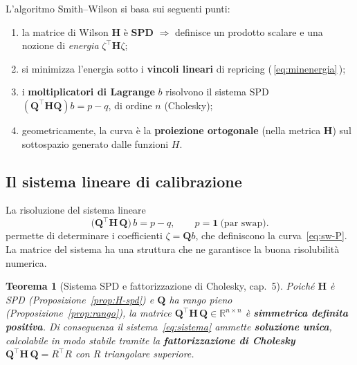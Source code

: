 \documentclass[11pt,a4paper]{article}
\theoremstyle{plain}
\newtheorem{teorema}{Teorema}[section]
\theoremstyle{definition}
\theoremstyle{remark}
\newcommand{\Qmat}{\mathbf{Q}}
\newcommand{\Hmat}{\mathbf{H}}
\newcommand{\transp}{^{\!\top}}
\begin{document}
\begin{keybox}
L'algoritmo Smith--Wilson si basa sui seguenti punti:
\begin{enumerate}
  \item la matrice di Wilson $\Hmat$ \`e \textbf{SPD} $\Rightarrow$ definisce un prodotto
        scalare e una nozione di \emph{energia} $\zeta\transp\Hmat\zeta$;
  \item si minimizza l'energia sotto i \textbf{vincoli lineari} di repricing
        (\,\eqref{eq:minenergia}\,);
  \item i \textbf{moltiplicatori di Lagrange} $b$ risolvono il sistema SPD
        $(\Qmat\transp\Hmat\Qmat)b = p-q$, di ordine $n$ (Cholesky);
  \item geometricamente, la curva \`e la \textbf{proiezione ortogonale} (nella metrica
        $\Hmat$) sul sottospazio generato dalle funzioni $H$.
\end{enumerate}
\end{keybox}

\subsection{Il sistema lineare di calibrazione}

La risoluzione del sistema lineare
\begin{equation}
  \bigl(\Qmat\transp \Hmat\, \Qmat\bigr)\, b = p - q,
  \qquad p = \mathbf{1}\ \text{(par swap)} .
  \label{eq:sistema}
\end{equation}
permette di determinare i coefficienti $\zeta = \Qmat b$, che definiscono la curva~\eqref{eq:sw-P}.
La matrice del sistema ha una struttura che ne garantisce la buona risolubilit\`a numerica.

\begin{teorema}[Sistema SPD e fattorizzazione di Cholesky, \cite{quarteroni2017} cap.~5]
\label{thm:spd}
Poich\'e $\Hmat$ \`e SPD (Proposizione~\ref{prop:H-spd}) e $\Qmat$ ha rango pieno
(Proposizione~\ref{prop:rango}), la matrice
$\Qmat\transp \Hmat\, \Qmat \in \mathbb{R}^{n\times n}$ \`e \textbf{simmetrica
definita positiva}. Di conseguenza il sistema~\eqref{eq:sistema} ammette \textbf{soluzione
unica}, calcolabile in modo stabile tramite la \textbf{fattorizzazione di Cholesky}
$\Qmat\transp \Hmat\,\Qmat = R\transp R$ con $R$ triangolare superiore.
\end{teorema}
\end{document}
